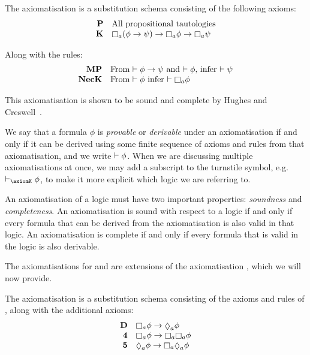 \begin{definition}\label{pre-axiom-k}
The axiomatisation \axiomK{} is a substitution schema consisting of the
following axioms:
$$
\begin{array}{rl}
{\bf P} & \text{All propositional tautologies}\\
{\bf K} & \knows_a (\phi \implies \psi) \implies \knows_a \phi \implies \knows_a \psi\\
\end{array}
$$

Along with the rules:
$$
\begin{array}{rl}
{\bf MP} & \text{From $\proves \phi \implies \psi$ and $\proves \phi$, infer
$\proves \psi$}\\
{\bf NecK} & \text{From $\proves \phi$ infer $\proves \knows_a \phi$}\\
\end{array}
$$
\end{definition}

This axiomatisation is shown to be sound and complete by Hughes and
Creswell~\cite{hughes1996new}.

We say that a formula $\phi$ is {\em provable} or {\em derivable} under an
axiomatisation if and only if it can be derived using some finite sequence of
axioms and rules from that axiomatisation, and we write $\vdash \phi$. When we
are discussing multiple axiomatisations at once, we may add a subscript to the
turnstile symbol, e.g. $\proves_\axiomK \phi$, to make it more explicit which
logic we are referring to.

An axiomatisation of a logic must have two important properties: {\em soundness}
and {\em completeness}. An axiomatisation is sound with respect to a logic if
and only if every formula that can be derived from the axiomatisation is also
valid in that logic. An axiomatisation is complete if and only if every formula
that is valid in the logic is also derivable.

The axiomatisations for \logicKD{} and \logicS{} are extensions of the
axiomatisation \axiomK{}, which we will now provide.

\begin{definition}
The axiomatisation \axiomKD{} is a substitution schema consisting of the axioms
and rules of \axiomK{}, along with the additional axioms:
$$
\begin{array}{rl}
{\bf D} & \knows_a \phi \implies \suspects_a \phi\\
{\bf 4} & \knows_a \phi \implies \knows_a \knows_a \phi\\
{\bf 5} & \suspects_a \phi \implies \knows_a \suspects_a \phi\\
\end{array}
$$
\end{definition}

